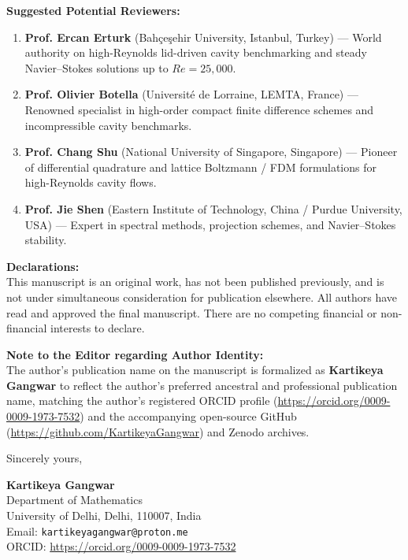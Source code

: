 \documentclass[11pt]{article}
\begin{document}
\vspace{0.8em}
\noindent\textbf{Suggested Potential Reviewers:}
\begin{enumerate}
    \item \textbf{Prof. Ercan Erturk} (Bah\c{c}e\c{s}ehir University, Istanbul, Turkey) --- World authority on high-Reynolds lid-driven cavity benchmarking and steady Navier--Stokes solutions up to $Re = 25,000$.
    \item \textbf{Prof. Olivier Botella} (Universit\'e de Lorraine, LEMTA, France) --- Renowned specialist in high-order compact finite difference schemes and incompressible cavity benchmarks.
    \item \textbf{Prof. Chang Shu} (National University of Singapore, Singapore) --- Pioneer of differential quadrature and lattice Boltzmann / FDM formulations for high-Reynolds cavity flows.
    \item \textbf{Prof. Jie Shen} (Eastern Institute of Technology, China / Purdue University, USA) --- Expert in spectral methods, projection schemes, and Navier--Stokes stability.
\end{enumerate}

\vspace{0.8em}
\noindent\textbf{Declarations:} \\
This manuscript is an original work, has not been published previously, and is not under simultaneous consideration for publication elsewhere. All authors have read and approved the final manuscript. There are no competing financial or non-financial interests to declare.

\vspace{0.8em}
\noindent\textbf{Note to the Editor regarding Author Identity:} \\
The author's publication name on the manuscript is formalized as \textbf{Kartikeya Gangwar} to reflect the author's preferred ancestral and professional publication name, matching the author's registered ORCID profile (\url{https://orcid.org/0009-0009-1973-7532}) and the accompanying open-source GitHub (\url{https://github.com/KartikeyaGangwar}) and Zenodo archives.

\vspace{1.2em}
\noindent Sincerely yours,

\vspace{1.5em}
\noindent\textbf{Kartikeya Gangwar} \\
Department of Mathematics \\
University of Delhi, Delhi, 110007, India \\
Email: \texttt{kartikeyagangwar@proton.me} \\
ORCID: \url{https://orcid.org/0009-0009-1973-7532}
\end{document}
